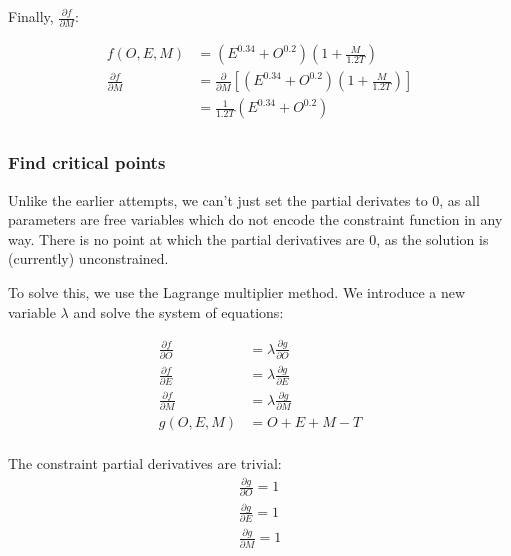 \documentclass{article}
\begin{document}
Finally, $\frac{\partial f}{\partial M}$:

\begin{equation}\label{eq:3dfdm}
  \begin{aligned}
    f(O, E, M) & = \left( E^{0.34} + O^{0.2} \right) \left( 1 + \frac{M}{1.2 T} \right) \\
    \frac{\partial f}{\partial M} & = \frac{\partial}{\partial M}\left[\left( E^{0.34} + O^{0.2} \right) \left( 1 + \frac{M}{1.2 T} \right)\right] \\
    & = \frac{1}{1.2 T}\left( E^{0.34} + O^{0.2} \right) \\
  \end{aligned}
\end{equation}

\subsubsection{Find critical points}

Unlike the earlier attempts, we can't just set the partial derivates to 0, as all parameters are free variables which do not encode the constraint function in any way. There is no point at which the partial derivatives are 0, as the solution is (currently) unconstrained.

To solve this, we use the Lagrange multiplier method. We introduce a new variable $\lambda$ and solve the system of equations:

\begin{equation}\label{eq:3lagrange}
  \begin{aligned}
    \frac{\partial f}{\partial O} & = \lambda \frac{\partial g}{\partial O} \\
    \frac{\partial f}{\partial E} & = \lambda \frac{\partial g}{\partial E} \\
    \frac{\partial f}{\partial M} & = \lambda \frac{\partial g}{\partial M} \\
    g(O, E, M) & = O + E + M - T \\
  \end{aligned}
\end{equation}

The constraint partial derivatives are trivial:
\begin{gather}
  \frac{\partial g}{\partial O} = 1 \\
  \frac{\partial g}{\partial E} = 1 \\
  \frac{\partial g}{\partial M} = 1
\end{gather}
\end{document}
